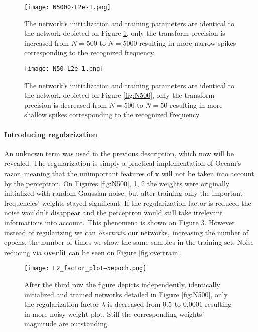 \begin{figure}
	\centering
	\texttt{[image: N5000-L2e-1.png]}
	\caption{The network's initialization and training parameters are identical to the network depicted on Figure \ref{fig:N5000}, only the transform precision is increased from $N=500$ to $N=5000$ resulting in more narrow spikes corresponding to the recognized frequency}
	
	\label{fig:N5000}
\end{figure}


\begin{figure}
	\centering
	\texttt{[image: N50-L2e-1.png]}
	\caption{The network's initialization and training parameters are identical to the network depicted on Figure \ref{fig:N500}, only the transform precision is decreased from $N=500$ to $N=50$ resulting in more shallow spikes corresponding to the recognized frequency}
	
	\label{fig:N50}
\end{figure}

\paragraph{Introducing regularization}
An unknown term was used in the previous description, which now will be revealed.
The regularization is simply a practical implementation of Occam's razor, meaning that the unimportant features of $\mathbf{x}$ will not be taken into account by the perceptron. On Figures \ref{fig:N500}, \ref{fig:N5000},  \ref{fig:N50} the weights were originally initialized with random Gaussian noise, but after training only the important frequencies' weights stayed significant. If the regularization factor is reduced the noise wouldn't disappear and the perceptron would still take irrelevant informations into account. This phenomena is shown on Figure \ref{fig:reg}. However instead of regularizing we can \emph{overtrain} our networks, increasing the number of epochs, the number of times we show the same samples in the training set. Noise reducing via \textbf{overfit} can be seen on Figure \ref{fig:overtrain}. 


\begin{figure}
	\centering
	\texttt{[image: L2\_factor\_plot--5epoch.png]}
	\caption{After the third row the figure depicts independently, identically initialized and trained networks detailed in Figure \ref{fig:N500}, only the regularization factor $\lambda$ is decreased from $0.5$ to $0.0001$ resulting in more noisy weight plot. Still the  corresponding weights' magnitude are outstanding}
	
	\label{fig:reg}
\end{figure}

